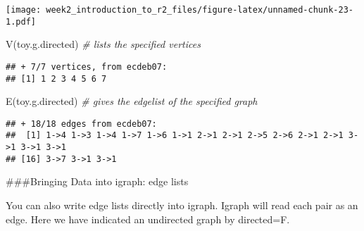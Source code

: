 \documentclass[
]{article}
\newenvironment{Shaded}{\begin{snugshade}}{\end{snugshade}}
\newcommand{\AttributeTok}[1]{\textcolor[rgb]{0.77,0.63,0.00}{#1}}
\newcommand{\CommentTok}[1]{\textcolor[rgb]{0.56,0.35,0.01}{\textit{#1}}}
\newcommand{\DecValTok}[1]{\textcolor[rgb]{0.00,0.00,0.81}{#1}}
\newcommand{\FunctionTok}[1]{\textcolor[rgb]{0.00,0.00,0.00}{#1}}
\newcommand{\NormalTok}[1]{#1}
\newcommand{\OtherTok}[1]{\textcolor[rgb]{0.56,0.35,0.01}{#1}}
\newcommand{\SpecialCharTok}[1]{\textcolor[rgb]{0.00,0.00,0.00}{#1}}
\begin{document}
\texttt{[image: week2\_introduction\_to\_r2\_files/figure-latex/unnamed-chunk-23-1.pdf]}

\begin{Shaded}
\begin{Highlighting}[]
\FunctionTok{V}\NormalTok{(toy.g.directed)         }\CommentTok{\# lists the specified vertices}
\end{Highlighting}
\end{Shaded}

\begin{verbatim}
## + 7/7 vertices, from ecdeb07:
## [1] 1 2 3 4 5 6 7
\end{verbatim}

\begin{Shaded}
\begin{Highlighting}[]
\FunctionTok{E}\NormalTok{(toy.g.directed)                   }\CommentTok{\# gives the edgelist of the specified graph}
\end{Highlighting}
\end{Shaded}

\begin{verbatim}
## + 18/18 edges from ecdeb07:
##  [1] 1->4 1->3 1->4 1->7 1->6 1->1 2->1 2->1 2->5 2->6 2->1 2->1 3->1 3->1 3->1
## [16] 3->7 3->1 3->1
\end{verbatim}

\#\#\#Bringing Data into igraph: edge lists

You can also write edge lists directly into igraph. Igraph will read
each pair as an edge. Here we have indicated an undirected graph by
directed=F.

\begin{Shaded}
\end{Shaded}
\end{document}

